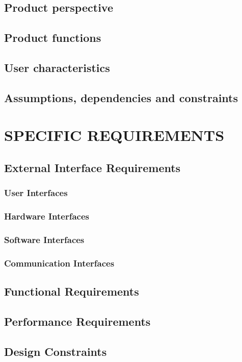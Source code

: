 \documentclass[11pt]{report}
\begin{document}
		\section{Product perspective}
		\section{Product functions}
		\section{User characteristics}
		\section{Assumptions, dependencies and constraints}
	\chapter{SPECIFIC REQUIREMENTS}
		\section{External Interface Requirements}
			\subsection{User Interfaces}
			\subsection{Hardware Interfaces}
			\subsection{Software Interfaces}
			\subsection{Communication Interfaces}
		\section{Functional Requirements}
			
		\section{Performance Requirements}
		\section{Design Constraints}
\end{document}
